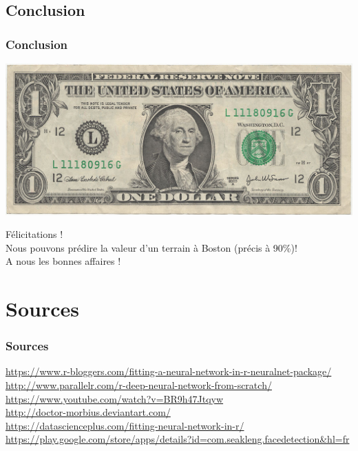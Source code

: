 \documentclass[compress]{beamer}
\begin{document}
\subsection{Conclusion}
\begin{frame}	\frametitle{Conclusion}
	\begin{centering}
		\vspace{-2em}
		\includegraphics[width=0.3\linewidth]{img/dollar}
		
		\huge Félicitations !\\
		\normalsize
		 Nous pouvons prédire la valeur d'un terrain à Boston (précis à 90\%)!\\A nous les bonnes affaires !\\
	\end{centering}
	
\end{frame}




\section*{Sources}
\begin{frame}
\frametitle{Sources}
	\url{https://www.r-bloggers.com/fitting-a-neural-network-in-r-neuralnet-package/}\\
	\url{http://www.parallelr.com/r-deep-neural-network-from-scratch/}\\
	\url{https://www.youtube.com/watch?v=BR9h47Jtqyw}\\
	\url{http://doctor-morbius.deviantart.com/}\\
	\url{https://datascienceplus.com/fitting-neural-network-in-r/}%
	\url{https://play.google.com/store/apps/details?id=com.seakleng.facedetection&hl=fr}
\end{frame}
\end{document}
